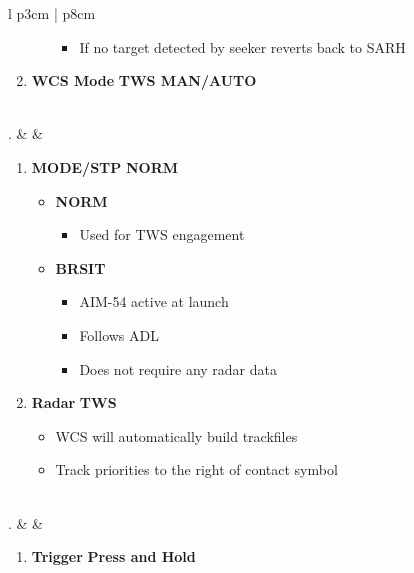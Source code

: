 \documentclass[8pt,usenames,dvipsnames,twoside]{article}
\begin{document}
\begin{center}
\begin{tabular}{l p{3cm} | p{8cm}}
\begin{minipage}[t]{\linewidth}
\begin{enumerate}[label=(\alph*)]
\begin{itemize}
\begin{itemize}
								\item If no target detected by seeker reverts back to SARH
							\end{itemize}
						\end{itemize}
						\item \textbf{WCS Mode} \dotfill \textbf{TWS MAN/AUTO}
					\end{enumerate}
				\end{minipage} \\
				. &  & 
				\begin{minipage}[t]{\linewidth}
					\vspace{-7pt}
					\begin{enumerate}[label=(\alph*)]
						\item \textbf{MODE/STP} \dotfill \textbf{NORM}
						\begin{itemize}
							\item \textbf{NORM}
							\begin{itemize}
								\item Used for TWS engagement
							\end{itemize}
							\item \textbf{BRSIT}
							\begin{itemize}
								\item AIM-54 active at launch
								\item Follows ADL
								\item Does not require any radar data
							\end{itemize}
						\end{itemize}
						\item \textbf{Radar} \dotfill \textbf{TWS}
						\begin{itemize}
							\item WCS will automatically build trackfiles
							\item Track priorities to the right of contact symbol
						\end{itemize}
					\end{enumerate}
				\end{minipage} \\
				. &  & 
				\begin{minipage}[t]{\linewidth}
					\vspace{-7pt}
					\begin{enumerate}[label=(\alph*)]
						\item \textbf{Trigger} \dotfill \textbf{Press and Hold} \\

\end{enumerate}
\end{minipage}
\end{tabular}
\end{center}
\end{document}

